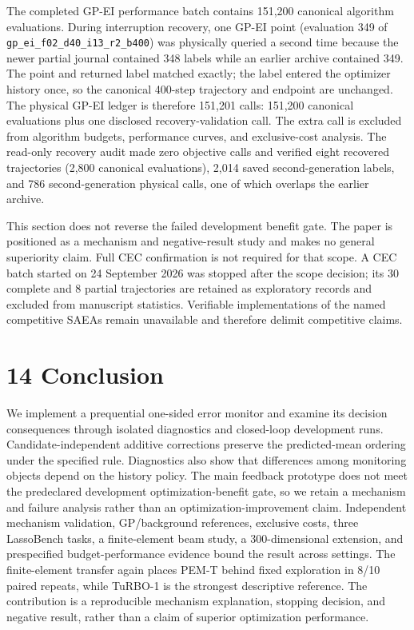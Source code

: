 \documentclass[11pt,a4paper]{article}
\begin{document}
The completed GP-EI performance batch contains 151,200 canonical
algorithm evaluations. During interruption recovery, one GP-EI point
(evaluation 349 of \texttt{gp\_ei\_f02\_d40\_i13\_r2\_b400}) was
physically queried a second time because the newer partial journal
contained 348 labels while an earlier archive contained 349. The point
and returned label matched exactly; the label entered the optimizer
history once, so the canonical 400-step trajectory and endpoint are
unchanged. The physical GP-EI ledger is therefore 151,201 calls: 151,200
canonical evaluations plus one disclosed recovery-validation call. The
extra call is excluded from algorithm budgets, performance curves, and
exclusive-cost analysis. The read-only recovery audit made zero
objective calls and verified eight recovered trajectories (2,800
canonical evaluations), 2,014 saved second-generation labels, and 786
second-generation physical calls, one of which overlaps the earlier
archive.

This section does not reverse the failed development benefit gate. The
paper is positioned as a mechanism and negative-result study and makes
no general superiority claim. Full CEC confirmation is not required for
that scope. A CEC batch started on 24 September 2026 was stopped after
the scope decision; its 30 complete and 8 partial trajectories are
retained as exploratory records and excluded from manuscript statistics.
Verifiable implementations of the named competitive SAEAs remain
unavailable and therefore delimit competitive claims.

\hypertarget{conclusion}{%
\section{14 Conclusion}\label{conclusion}}

We implement a prequential one-sided error monitor and examine its
decision consequences through isolated diagnostics and closed-loop
development runs. Candidate-independent additive corrections preserve
the predicted-mean ordering under the specified rule. Diagnostics also
show that differences among monitoring objects depend on the history
policy. The main feedback prototype does not meet the predeclared
development optimization-benefit gate, so we retain a mechanism and
failure analysis rather than an optimization-improvement claim.
Independent mechanism validation, GP/background references, exclusive
costs, three LassoBench tasks, a finite-element beam study, a
300-dimensional extension, and prespecified budget-performance evidence
bound the result across settings. The finite-element transfer again
places PEM-T behind fixed exploration in 8/10 paired repeats, while
TuRBO-1 is the strongest descriptive reference. The contribution is a
reproducible mechanism explanation, stopping decision, and negative
result, rather than a claim of superior optimization performance.
\end{document}
